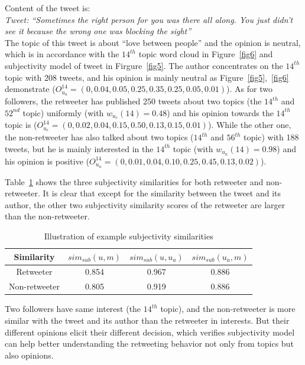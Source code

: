 \documentclass{acm_proc_article-sp}
\begin{document}
Content of the tweet is:\\
\textit{Tweet: ``Sometimes the right person for you was there all along. You just didn’t see it because the wrong one was blocking the sight''} \\

The topic of this tweet is about ``love between people'' and the opinion is neutral, which is in accordance with the $ 14^{th} $ topic word cloud in Figure~\ref{fig6} and subjectivity model of tweet in Firgure~\ref{fig5}.
The author concentrates on the $ 14^{th} $ topic with 208 tweets, and his opinion is mainly neutral as Figure~\ref{fig5},~\ref{fig6} demonstrate ($O_{u_{a}}^{14} =( 0, 0.04, 0.05, 0.25, 0.35, 0.25, 0.05,  0.01 )$). 
As for two followers, the retweeter has published 250 tweets about two topics (the $ 14^{th} $ and $ 52^{nd} $ topic) uniformly (with $ w_{u_{r}}(14)=0.48 $) and his opinion towards the $ 14^{th} $ topic is ($O_{u_{r}}^{14} =( 0, 0.02, 0.04, 0.15, 0.50, 0.13,  0.15,  0.01)$). 
While the other one, the non-retweeter has also talked about two topics ($ 14^{th} $ and $ 56^{th} $ topic) with 188 tweets, but he is mainly interested in the $ 14^{th} $ topic (with $ w_{u_{n}}(14)=0.98 $) and his opinion is positive ($O_{u_{n}}^{14} =( 0, 0.01, 0.04, 0.10, 0.25, 0.45, 0.13, 0.02)$).

Table~\ref{tab4} shows the three subjectivity similarities for both retweeter and non-retweeter. It is clear that except for the similarity between the tweet and its author, the other two subjectivity similarity scores of the retweeter are larger than the non-retweeter. 
\begin{table}[h]
\scriptsize
\centering
\caption{ Illustration of example subjectivity similarities}
\label{tab4}
\begin{tabular}{|c|c|c|c|}
\hline
Similarity & $ sim_{sub} \left( u,m \right) $ & $ sim_{sub}\left( u,u_{a} \right)  $ & $ sim_{sub}\left( u_{a},m \right)  $\\
\hline
Retweeter & 0.854 & 0.967 & 0.886\\
\hline
Non-retweeter & 0.805 & 0.919 & 0.886\\
\hline
\end{tabular}
\end{table} 
Two followers have same interest (the $ 14^{th} $ topic), and the non-retweeter is more similar with the tweet and its author than the retweeter in interests. But their different opinions elicit their different decision, which verifies subjectivity model can help better understanding the retweeting behavior not only from topics but also opinions.
\end{document}
